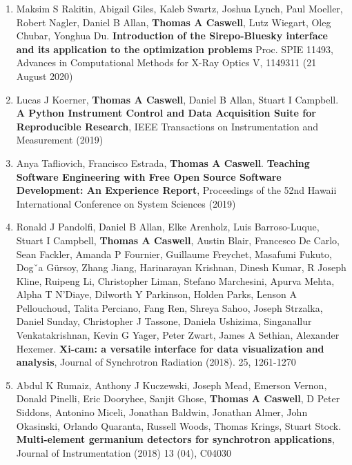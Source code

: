 \documentclass[12pt]{article}
\numberwithin{page}{section}
\begin{document}
\begin{enumerate}[noitemsep]
    \item Maksim S Rakitin, Abigail Giles, Kaleb Swartz, Joshua Lynch,
      Paul Moeller, Robert Nagler, Daniel B Allan, \textbf{Thomas A Caswell},
      Lutz Wiegart, Oleg Chubar, Yonghua Du. \textbf{Introduction of
        the Sirepo-Bluesky interface and its application to the
        optimization problems} Proc. SPIE 11493, Advances in
      Computational Methods for X-Ray Optics V, 1149311 (21 August
      2020)

  \item Lucas J Koerner, \textbf{Thomas A Caswell}, Daniel B Allan,
    Stuart I Campbell. \textbf{A Python Instrument Control and Data
      Acquisition Suite for Reproducible Research}, IEEE Transactions
    on Instrumentation and Measurement (2019)

  \item Anya Tafliovich, Francisco Estrada, \textbf{Thomas A Caswell}.
    \textbf{Teaching Software Engineering with Free Open Source
      Software Development: An Experience Report}, Proceedings of the
    52nd Hawaii International Conference on System Sciences (2019)

  \item Ronald J Pandolfi, Daniel B Allan, Elke Arenholz, Luis
    Barroso-Luque, Stuart I Campbell, \textbf{Thomas A Caswell},
    Austin Blair, Francesco De Carlo, Sean Fackler, Amanda P Fournier,
    Guillaume Freychet, Masafumi Fukuto, Dogˇa Gürsoy, Zhang Jiang,
    Harinarayan Krishnan, Dinesh Kumar, R Joseph Kline, Ruipeng Li,
    Christopher Liman, Stefano Marchesini, Apurva Mehta, Alpha T
    N'Diaye, Dilworth Y Parkinson, Holden Parks, Lenson A Pellouchoud,
    Talita Perciano, Fang Ren, Shreya Sahoo, Joseph Strzalka, Daniel
    Sunday, Christopher J Tassone, Daniela Ushizima, Singanallur
    Venkatakrishnan, Kevin G Yager, Peter Zwart, James A Sethian,
    Alexander Hexemer. \textbf{Xi-cam: a versatile interface for data
      visualization and analysis}, Journal of Synchrotron Radiation
    (2018). 25, 1261-1270

  \item Abdul K Rumaiz, Anthony J Kuczewski, Joseph Mead, Emerson
    Vernon, Donald Pinelli, Eric Dooryhee, Sanjit Ghose,
    \textbf{Thomas A Caswell}, D Peter Siddons, Antonino Miceli,
    Jonathan Baldwin, Jonathan Almer, John Okasinski, Orlando
    Quaranta, Russell Woods, Thomas Krings, Stuart Stock.
    \textbf{Multi-element germanium detectors for synchrotron
      applications}, Journal of Instrumentation (2018) 13 (04), C04030


\end{enumerate}
\end{document}

